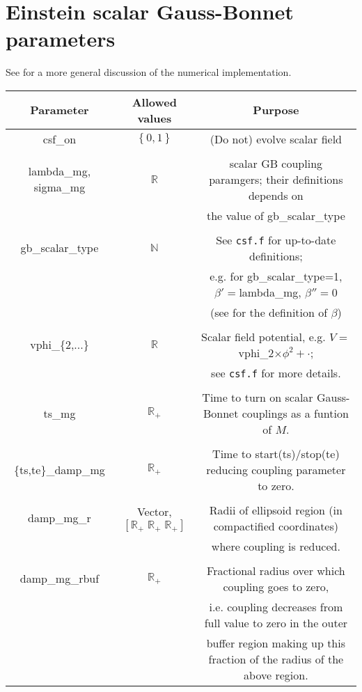 \documentclass{article}
\begin{document}
\section*{Einstein scalar Gauss-Bonnet parameters}
See \cite{East:2020hgw} for a more general discussion of the numerical
implementation.
\begin{table}[h]
   \centering 
   \begin{tabular}{ccc}
      Parameter  & Allowed values & Purpose \\
      \midrule\midrule
      csf\_on 
      &
      $\left\{0,1\right\}$
      &
      (Do not) evolve scalar field
      \\ \\
      lambda\_mg, sigma\_mg 
      &
      $\mathbb{R}$
      &
      scalar GB coupling paramgers; their definitions depends on
      \\
      & & 
      the value of gb\_scalar\_type
      \\ \\
      gb\_scalar\_type
      &
      $\mathbb{N}$
      &
      See \texttt{csf.f} for up-to-date definitions;
      \\& & 
      e.g. for 
      gb\_scalar\_type=1, $\beta'=$lambda\_mg, $\beta''=0$
      \\& & 
      (see \cite{East:2020hgw} for the definition of $\beta$)
      \\ \\
      vphi\_\{2,...\}
      &
      $\mathbb{R}$
      &
      Scalar field potential, e.g. $V=$vphi\_2$\times\phi^2+\cdot$;
      \\& &
      see \texttt{csf.f} for more details.
      \\ \\
      ts\_mg 
      &
      $\mathbb{R}_+$
      &
      Time to turn on scalar Gauss-Bonnet couplings as a funtion of $M$.
      \\ \\
      \{ts,te\}\_damp\_mg 
      &
      $\mathbb{R}_+$
      &
      Time to start(ts)/stop(te) reducing coupling parameter to zero.
      \\ \\
      damp\_mg\_r 
      &
      Vector, $\left[
         \mathbb{R}_+ \; \mathbb{R}_+ \; \mathbb{R}_+
      \right]$
      &
      Radii of ellipsoid region (in compactified coordinates) 
      \\
      & & 
      where coupling is reduced.
      \\ \\
      damp\_mg\_rbuf 
      &
      $\mathbb{R}_+$
      &
      Fractional radius over which coupling goes to zero,
      \\
      & & 
      i.e. coupling decreases from full value to zero in the outer 
      \\
      & & 
      buffer region making up this fraction of the radius of the above region.
   \end{tabular}
\end{table}


\end{document}
